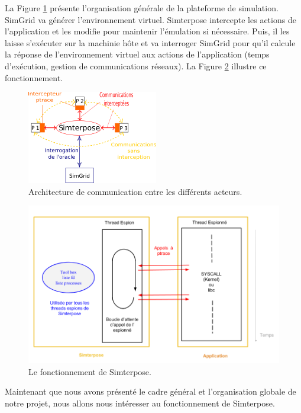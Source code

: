 La Figure \ref{Organisation_generale} présente l'organisation générale de la plateforme de simulation. SimGrid va générer l'environnement virtuel. Simterpose intercepte les
actions de l'application et les modifie pour maintenir l'émulation si
nécessaire. Puis, il les laisse
s'exécuter sur la machinie hôte et va interroger SimGrid pour qu'il calcule la
réponse de l'environnement virtuel aux actions de l'application (temps d'exécution, gestion de communications réseaux). La Figure \ref{Organisation_Simterpose} illustre ce fonctionnement.

\begin{figure}
  \centering
  \includegraphics{Pictures/png/Communications_Simterpose_interprocess_v2}
  \caption{Architecture de communication entre les différents acteurs.}
  \label{Organisation_generale}
\end{figure}

\begin{figure}[H]
  \centering
  \includegraphics[scale=0.5]{Pictures/png/Simterpose_orga_code_v4}
  \caption{Le fonctionnement de Simterpose.}
  \label{Organisation_Simterpose}
\end{figure}

Maintenant que nous avons présenté le cadre général et l'organisation globale
de notre projet, nous allons nous intéresser au fonctionnement de Simterpose.
